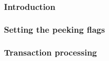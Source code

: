 \subsubsection{Introduction                \lispNone{}}   \label{hub: tx skip: user: intro}                     
\subsubsection{Setting the peeking flags   }   \label{hub: tx skip: user: setting peeking flags}      %
\subsubsection{Transaction processing      }   \label{hub: tx skip: user: transation processing}      %
